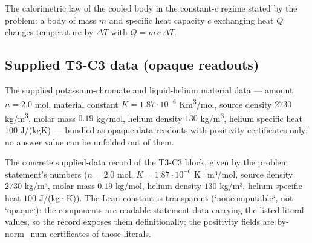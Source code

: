 \begin{definition}
\label{def:IPhO2026Problems_problem_IPhO_2026_3_C_3:ConstantCapacityCalorimetry}
The calorimetric law of the cooled body in the constant-$c$ regime stated by
the problem: a body of mass $m$ and specific heat capacity $c$ exchanging
heat $Q$ changes temperature by $\Delta T$ with $Q = m\,c\,\Delta T$.
\end{definition}

\subsection*{Supplied T3-C3 data (opaque readouts)}

\begin{definition}
\label{def:IPhO2026Problems_problem_IPhO_2026_3_C_3:SuppliedMaterialData}
The supplied potassium-chromate and liquid-helium material data — amount
$n = 2.0$ mol, material constant $K = 1.87{\cdot}10^{-6}$ K\cdot m\textsuperscript{3}/mol,
source density $2730$ kg/m\textsuperscript{3}, molar mass $0.19$ kg/mol,
helium density $130$ kg/m\textsuperscript{3}, helium specific heat
$100$ J/(kg\cdot K) — bundled as opaque data readouts with positivity
certificates only; no answer value can be unfolded out of them.
\end{definition}

\begin{definition}
\label{def:IPhO2026Problems_problem_IPhO_2026_3_C_3:suppliedData}
The concrete supplied-data record of the T3-C3 block, given by the problem
statement's numbers ($n = 2.0$ mol, $K = 1.87{\cdot}10^{-6}$ K·m³/mol,
source density $2730$ kg/m³, molar mass $0.19$ kg/mol, helium density
$130$ kg/m³, helium specific heat $100$ J/(kg·K)).  The Lean constant is
transparent (`noncomputable`, not `opaque`): the components are readable
statement data carrying the listed literal values, so the record exposes
them definitionally; the positivity fields are by-norm\_num certificates
of those literals.
\end{definition}

